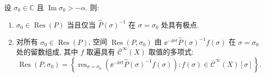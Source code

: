 \begin{proposition}[谐振态的刻画]\label{prop:11.20}
设 $\sigma_0 \in \mathbb{C}$ 且 $\operatorname{Im}\sigma_0 > -\alpha$. 则:
\begin{enumerate}[label=(\arabic*)]
    \item $\sigma_0 \in \operatorname{Res}(P)$ 当且仅当 $\widehat{P}(\sigma)^{-1}$ 在 $\sigma = \sigma_0$ 处具有极点.
    \item 对所有 $\sigma_0 \in \operatorname{Res}(P)$, 空间 $\operatorname{Res}(P, \sigma_0)$ 由 $\ee^{-\ii \sigma t} \widehat{P}(\sigma)^{-1} f(\sigma)$ 在 $\sigma = \sigma_0$ 处的留数组成, 其中 $f$ 取遍具有 $\bar{\mathcal{C}}^\infty(X)$ 取值的多项式:
    \begin{equation}\label{eq:11.78}
        \operatorname{Res}(P, \sigma_0) = \left\{ \operatorname{res}_{\sigma = \sigma_0}\left( \ee^{-\ii \sigma t} \widehat{P}(\sigma)^{-1} f(\sigma) \right) : f(\sigma) \in \bar{\mathcal{C}}^\infty(X)[\sigma] \right\}.
    \end{equation}
\end{enumerate}
\end{proposition}

